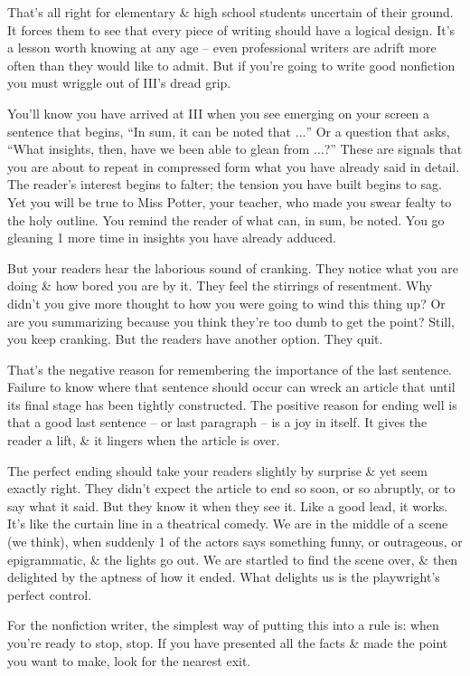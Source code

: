 \documentclass{article}
\begin{document}
That's all right for elementary \& high school students uncertain of their ground. It forces them to see that every piece of writing should have a logical design. It's a lesson worth knowing at any age -- even professional writers are adrift more often than they would like to admit. But if you're going to write good nonfiction you must wriggle out of III's dread grip.

You'll know you have arrived at III when you see emerging on your screen a sentence that begins, ``In sum, it can be noted that $\ldots$'' Or a question that asks, ``What insights, then, have we been able to glean from $\ldots$?'' These are signals that you are about to repeat in compressed form what you have already said in detail. The reader's interest begins to falter; the tension you have built begins to sag. Yet you will be true to Miss Potter, your teacher, who made you swear fealty to the holy outline. You remind the reader of what can, in sum, be noted. You go gleaning 1 more time in insights you have already adduced.

But your readers hear the laborious sound of cranking. They notice what you are doing \& how bored you are by it. They feel the stirrings of resentment. Why didn't you give more thought to how you were going to wind this thing up? Or are you summarizing because you think they're too dumb to get the point? Still, you keep cranking. But the readers have another option. They quit.

That's the negative reason for remembering the importance of the last sentence. Failure to know where that sentence should occur can wreck an article that until its final stage has been tightly constructed. The positive reason for ending well is that a good last sentence -- or last paragraph -- is a joy in itself. It gives the reader a lift, \& it lingers when the article is over.

The perfect ending should take your readers slightly by surprise \& yet seem exactly right. They didn't expect the article to end so soon, or so abruptly, or to say what it said. But they know it when they see it. Like a good lead, it works. It's like the curtain line in a theatrical comedy. We are in the middle of a scene (we think), when suddenly 1 of the actors says something funny, or outrageous, or epigrammatic, \& the lights go out. We are startled to find the scene over, \& then delighted by the aptness of how it ended. What delights us is the playwright's perfect control.

For the nonfiction writer, the simplest way of putting this into a rule is: when you're ready to stop, stop. If you have presented all the facts \& made the point you want to make, look for the nearest exit.
\end{document}
